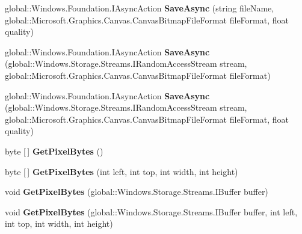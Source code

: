 \begin{DoxyCompactItemize}
global\+::\+Windows.\+Foundation.\+I\+Async\+Action {\bfseries Save\+Async} (string file\+Name, global\+::\+Microsoft.\+Graphics.\+Canvas.\+Canvas\+Bitmap\+File\+Format file\+Format, float quality)
\item 
\mbox{\label{interface_microsoft_1_1_graphics_1_1_canvas_1_1_i_canvas_bitmap_a5dcf0ab30780f638bbfddc389d7b02db}} 
global\+::\+Windows.\+Foundation.\+I\+Async\+Action {\bfseries Save\+Async} (global\+::\+Windows.\+Storage.\+Streams.\+I\+Random\+Access\+Stream stream, global\+::\+Microsoft.\+Graphics.\+Canvas.\+Canvas\+Bitmap\+File\+Format file\+Format)
\item 
\mbox{\label{interface_microsoft_1_1_graphics_1_1_canvas_1_1_i_canvas_bitmap_afdef00bc9d9842506f809195ede3782f}} 
global\+::\+Windows.\+Foundation.\+I\+Async\+Action {\bfseries Save\+Async} (global\+::\+Windows.\+Storage.\+Streams.\+I\+Random\+Access\+Stream stream, global\+::\+Microsoft.\+Graphics.\+Canvas.\+Canvas\+Bitmap\+File\+Format file\+Format, float quality)
\item 
\mbox{\label{interface_microsoft_1_1_graphics_1_1_canvas_1_1_i_canvas_bitmap_ab71519e7f2009a2ac025f505eab45531}} 
byte \mbox{[}$\,$\mbox{]} {\bfseries Get\+Pixel\+Bytes} ()
\item 
\mbox{\label{interface_microsoft_1_1_graphics_1_1_canvas_1_1_i_canvas_bitmap_a41fdae7de41d057403b9f1a16ecff1d2}} 
byte \mbox{[}$\,$\mbox{]} {\bfseries Get\+Pixel\+Bytes} (int left, int top, int width, int height)
\item 
\mbox{\label{interface_microsoft_1_1_graphics_1_1_canvas_1_1_i_canvas_bitmap_a36158bf3dac9d5cdb9a1a41a7fc3708d}} 
void {\bfseries Get\+Pixel\+Bytes} (global\+::\+Windows.\+Storage.\+Streams.\+I\+Buffer buffer)
\item 
\mbox{\label{interface_microsoft_1_1_graphics_1_1_canvas_1_1_i_canvas_bitmap_a6854e3ad20296f41992100acc94e6bdb}} 
void {\bfseries Get\+Pixel\+Bytes} (global\+::\+Windows.\+Storage.\+Streams.\+I\+Buffer buffer, int left, int top, int width, int height)

\end{DoxyCompactItemize}
